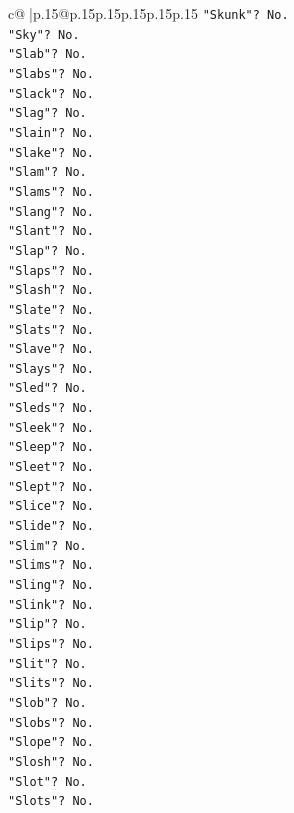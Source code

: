 \documentclass{article}
\begin{document}
{\begin{supertabular}{c@{$\;$}|p{.15\linewidth}@{}p{.15\linewidth}p{.15\linewidth}p{.15\linewidth}p{.15\linewidth}p{.15\linewidth}}
{{{\texttt{"Skunk"? No.} \\
\texttt{"Sky"? No.} \\
\texttt{"Slab"? No.} \\
\texttt{"Slabs"? No.} \\
\texttt{"Slack"? No.} \\
\texttt{"Slag"? No.} \\
\texttt{"Slain"? No.} \\
\texttt{"Slake"? No.} \\
\texttt{"Slam"? No.} \\
\texttt{"Slams"? No.} \\
\texttt{"Slang"? No.} \\
\texttt{"Slant"? No.} \\
\texttt{"Slap"? No.} \\
\texttt{"Slaps"? No.} \\
\texttt{"Slash"? No.} \\
\texttt{"Slate"? No.} \\
\texttt{"Slats"? No.} \\
\texttt{"Slave"? No.} \\
\texttt{"Slays"? No.} \\
\texttt{"Sled"? No.} \\
\texttt{"Sleds"? No.} \\
\texttt{"Sleek"? No.} \\
\texttt{"Sleep"? No.} \\
\texttt{"Sleet"? No.} \\
\texttt{"Slept"? No.} \\
\texttt{"Slice"? No.} \\
\texttt{"Slide"? No.} \\
\texttt{"Slim"? No.} \\
\texttt{"Slims"? No.} \\
\texttt{"Sling"? No.} \\
\texttt{"Slink"? No.} \\
\texttt{"Slip"? No.} \\
\texttt{"Slips"? No.} \\
\texttt{"Slit"? No.} \\
\texttt{"Slits"? No.} \\
\texttt{"Slob"? No.} \\
\texttt{"Slobs"? No.} \\
\texttt{"Slope"? No.} \\
\texttt{"Slosh"? No.} \\
\texttt{"Slot"? No.} \\
\texttt{"Slots"? No.} \\
}}}
\end{supertabular}}
\end{document}
